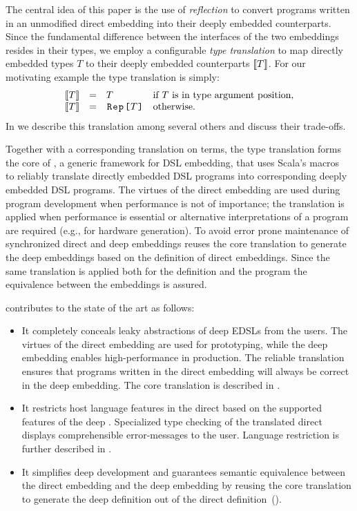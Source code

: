 The central idea of this paper is the use of \emph{reflection} to convert
programs written in an unmodified direct embedding into their deeply
embedded counterparts.  Since the fundamental difference between the
interfaces of the two embeddings resides in their types, we employ a
configurable \emph{type translation} to map directly embedded
types $T$ to their deeply embedded counterparts $\llbracket T \rrbracket$. For our
motivating example the type translation is simply:
\[
\begin{array}{llll}
  \ttrone{T} &=& T   & \text{if $T$ is in type argument position,}  \\
  \ttrone{T} &=& \text{\code{Rep[}}T\text{\code{]}}& \text{otherwise}.
\end{array}
\]
In  we describe this translation among several
others and discuss their trade-offs.

Together with a corresponding translation on terms, the type
translation forms the core of \yy, a generic framework for DSL
embedding, that uses Scala's macros~\cite{burmako_scala_2013} to
reliably translate directly embedded DSL programs into corresponding
deeply embedded DSL programs.  The virtues of the direct embedding are
used during program development when performance is not of importance;
the translation is applied when performance is essential or
alternative interpretations of a program are required (e.g., for
hardware generation).  To avoid error prone maintenance of
synchronized direct and deep embeddings \yy reuses the core
translation to generate the deep embeddings based on the definition of
direct embeddings. Since the same translation is applied both for the
\edsl definition and the \edsl program the equivalence between the
embeddings is assured.

\yy{} contributes to the state of the art as follows:
\begin{itemize}

  \item It completely conceals leaky abstractions of deep EDSLs from the users.
  The virtues of the direct embedding are used for prototyping, while the deep
  embedding enables high-performance in production. The reliable translation
  ensures that programs written in the direct embedding will always be correct
  in the deep embedding. The core translation is described in .

  \item It restricts host language features in the direct \edsl{} based on the
  supported features of the deep \edsl{}. Specialized type checking of the
  translated direct \edsl{} displays comprehensible error-messages to the user.
  Language restriction is further described in .

  \item It simplifies deep \edsl development and guarantees semantic equivalence
  between the direct embedding and the deep embedding by reusing the core
  translation to generate the deep \edsl definition out of the direct \edsl
  definition~().


\end{itemize}

